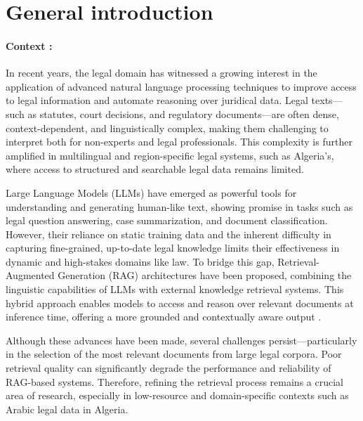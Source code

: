 \chapter*{General introduction}
\pagestyle{fancy}
\pagestyle{fancy}\chead{} \pagestyle{fancy}\rhead{}
\pagestyle{fancy}
\pagestyle{fancy}\cfoot{} \pagestyle{fancy}\rfoot{\thepage}
\subsubsection*{Context :}
In recent years, the legal domain has witnessed a growing interest in the application of advanced natural language processing techniques to improve access to legal information and automate reasoning over juridical data. Legal texts—such as statutes, court decisions, and regulatory documents—are often dense, context-dependent, and linguistically complex, making them challenging to interpret both for non-experts and legal professionals. This complexity is further amplified in multilingual and region-specific legal systems, such as Algeria's\cite{inproceedings}, where access to structured and searchable legal data remains limited.

Large Language Models (LLMs) have emerged as powerful tools for understanding and generating human-like text, showing promise in tasks such as legal question answering, case summarization, and document classification\cite{Naveed2024}. However, their reliance on static training data and the inherent difficulty in capturing fine-grained, up-to-date legal knowledge limits their effectiveness in dynamic and high-stakes domains like law. To bridge this gap, Retrieval-Augmented Generation (RAG) architectures have been proposed, combining the linguistic capabilities of LLMs with external knowledge retrieval systems. This hybrid approach enables models to access and reason over relevant documents at inference time, offering a more grounded and contextually aware output \cite{lewis2020retrieval}.

Although these advances have been made, several challenges persist—particularly in the selection of the most relevant documents from large legal corpora. Poor retrieval quality can significantly degrade the performance and reliability of RAG-based systems. Therefore, refining the retrieval process remains a crucial area of research, especially in low-resource and domain-specific contexts \cite{Information_Retrieval} such as Arabic legal data in Algeria.
